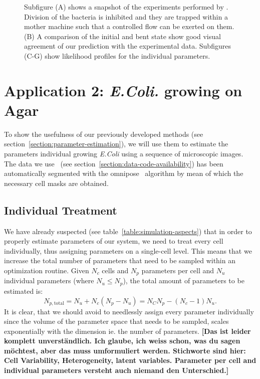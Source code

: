 \documentclass{article}
\begin{document}
\begin{figure}
\begin{minipage}{0.62\textwidth}
\begin{tikzonimage}[width=0.33\textwidth]
        \end{tikzonimage}%
    \end{minipage}
    \caption{
        Subfigure (A) shows a snapshot of the experiments performed by \cite{Amir2014_2}.
        Division of the bacteria is inhibited and they are trapped within a mother machine such that
        a controlled flow can be exerted on them.
        (B) A comparison of the initial and bent state show good visual agreement of our prediction
        with the experimental data.
        Subfigures (C-G) show likelihood profiles for the individual parameters.
    }
    \label{fig:amir-bending-simulation}
\end{figure}


\section{Application 2: \textit{E.Coli.} growing on Agar}
\label{section:application-2}
To show the usefulness of our previously developed methods
(see section~\ref{section:parameter-estimation}), we will use them to estimate the parameters
individual growing \textit{E.Coli} using a sequence of microscopic images.
The data we use~\cite{https://doi.org/10.3203/iwf/k-129} (see
section~\ref{section:data-code-availability}) has been automatically segmented with the
omnipose~\cite{Cutler2022} algorithm by mean of which the necessary cell masks are obtained.

\subsection{Individual Treatment}

We have already suspected (see table~\ref{table:simulation-aspects}) that in order to properly
estimate parameters of our system, we need to treat every cell individually, thus assigning
parameters on a single-cell level.
This means that we increase the total number of parameters that need to be sampled within an
optimization routine.
Given $N_c$ cells and $N_p$ parameters per cell and $N_u$ individual parameters (where $N_u\leq N_p$), the total amount of parameters to be estimated is:
\begin{equation}
    N_{p,\text{total}} = N_u + N_c (N_p - N_u) = N_C N_p - (N_c - 1) N_u.
\end{equation}
It is clear, that we should avoid to needlessly assign every parameter individually since the volume
of the parameter space that needs to be sampled, scales exponentially with the dimension ie. the
number of parameters.
\textbf{[Das ist leider komplett unverständlich. Ich glaube, ich weiss schon, was du sagen möchtest, aber das muss umformuliert werden. Stichworte sind hier: Cell Variability, Heterogeneity, latent variables. Parameter per cell and individual parameters versteht auch niemand den Unterschied.]}
\end{document}
